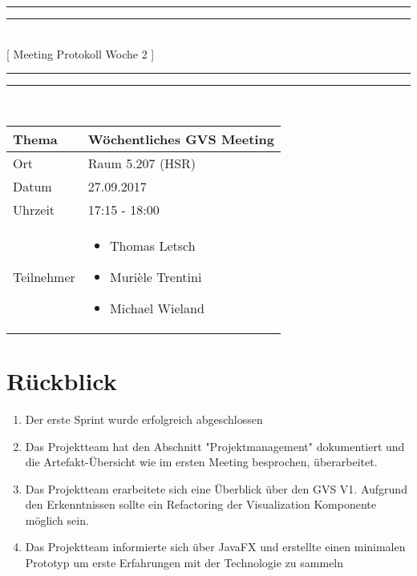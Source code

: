 \documentclass[11pt, a4paper,oneside]{scrartcl}
\begin{document}
\centering
\rule{\textwidth}{1.6pt}\vspace*{-\baselineskip}\vspace*{2pt} %
\rule{\textwidth}{0.4pt}\\[\baselineskip] %
{\LARGE [ Meeting Protokoll Woche 2 ]}\\[0.2\baselineskip] %
\rule{\textwidth}{0.4pt}\vspace*{-\baselineskip}\vspace{3.2pt} %
\rule{\textwidth}{1.6pt}\\[2\baselineskip] %

\begin{tabu} to \linewidth {l X }
	\toprule
	\textbf{Thema} & \textbf{Wöchentliches GVS Meeting} \\
	\midrule
	Ort & Raum 5.207 (HSR) \\
	Datum & 27.09.2017 \\
	Uhrzeit & 17:15 - 18:00 \\
	Teilnehmer & 
	\begin{minipage}[t]{\textwidth}
	  	\begin{itemize}
	  		\item Thomas Letsch
			\item Murièle Trentini
			\item Michael Wieland
	  	\end{itemize}
	\end{minipage}
	\\
	\bottomrule
\end{tabu}


\section{Rückblick}
\begin{enumerate}
	\item Der erste Sprint wurde erfolgreich abgeschlossen 
	\item Das Projektteam hat den Abschnitt "Projektmanagement" dokumentiert und die Artefakt-Übersicht wie im ersten Meeting besprochen, überarbeitet.
	\item Das Projektteam erarbeitete sich eine Überblick über den GVS V1. Aufgrund den Erkenntnissen sollte ein Refactoring der Visualization Komponente möglich sein. 
	\item Das Projektteam informierte sich über JavaFX und erstellte einen minimalen Prototyp um erste Erfahrungen mit der Technologie zu sammeln
\end{enumerate}
\end{document}
